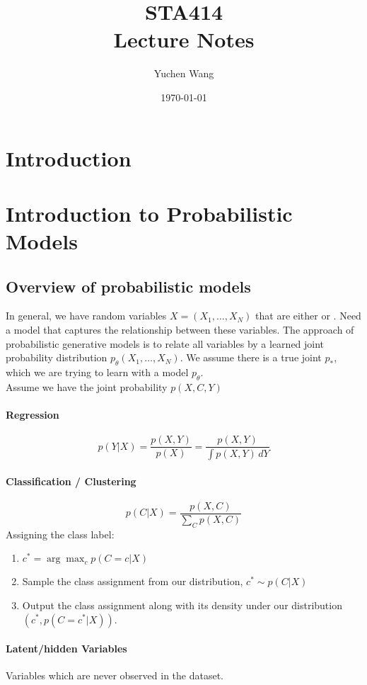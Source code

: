 \documentclass[11pt]{article}
\title{STA414\\ Lecture Notes}
\author{Yuchen Wang}
\date{\today}
\begin{document}
    \maketitle
    \tableofcontents
    \newpage

\section{Introduction}
\section{Introduction to Probabilistic Models}
\subsection{Overview of probabilistic models}
In general, we have random variables $X = (X_1, \hdots, X_N)$ that are either  or . Need a model that captures the relationship between these variables. The approach of probabilistic generative models is to relate all variables by a learned joint probability distribution $p_\theta(X_1, \hdots, X_N)$. We assume there is a true joint $p_*$, which we are trying to learn with a model $p_\theta$. \\
Assume we have the joint probability $p(X,C,Y)$
\paragraph{Regression}
$$p(Y|X) = \frac{p(X,Y)}{p(X)} = \frac{p(X,Y)}{\int p(X,Y)\, dY}$$

\paragraph{Classification / Clustering}
$$p(C|X) = \frac{p(X,C)}{\sum_C p(X,C)}$$
Assigning the class label:
\begin{enumerate}
	\item $c^* = \arg \max_c p(C=c|X)$
	\item Sample the class assignment from our distribution, $c^* \sim p(C|X)$
	\item Output the class assignment along with its density under our distribution $(c^*, p(C=c^*|X))$. 
\end{enumerate}

\paragraph{Latent/hidden Variables}
Variables which are never observed in the dataset.
\end{document}

